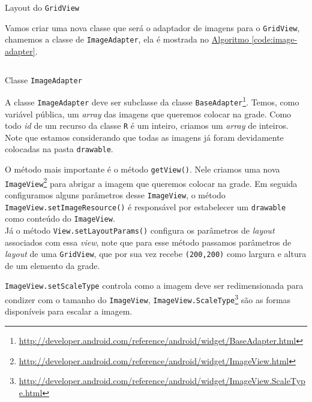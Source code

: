 \documentclass[a4paper,12pt,brazil,oneside]{book}
\begin{document}
\begin{listing}[H]
\inputminted[linenos=true,fontsize=\small,frame=lines, framesep=2mm, tabsize=2,numbersep=5pt]{xml}{src/design/gridview.xml}
\caption{Layout do \texttt{GridView}}
\end{listing}	

Vamos criar uma nova classe que será o adaptador de imagens para o \texttt{GridView}, chamemos a classe de \texttt{ImageAdapter}, ela é mostrada no \hyperref[code:image-adapter]{Algoritmo \ref*{code:image-adapter}}.

\begin{listing}[H]
\inputminted[linenos=true,fontsize=\small,frame=lines, framesep=2mm, tabsize=2,numbersep=5pt]{java}{src/design/imageadapter.java}
\caption{Classe \texttt{ImageAdapter}}
\label{code:image-adapter}
\end{listing}	

A classe \texttt{ImageAdapter} deve ser subclasse da classe \texttt{BaseAdapter}\footnote{\href{http://developer.android.com/reference/android/widget/BaseAdaptfer.html}{http://developer.android.com/reference/android/widget/BaseAdapter.html}}. Temos, como variável pública, um \emph{array} das imagens que queremos colocar na grade. Como todo \emph{id} de um recurso da classe \texttt{R} é um inteiro, criamos um \emph{array} de inteiros. Note que estamos considerando que todas as imagens já foram devidamente colocadas na pasta \texttt{drawable}.

O método mais importante é o método \texttt{getView()}. Nele criamos uma nova \texttt{ImageView}\footnote{\href{http://developer.android.com/reference/android/widget/ImageView.html}{http://developer.android.com/reference/android/widget/ImageView.html}} para abrigar a imagem que queremos colocar na grade. Em seguida configuramos alguns parâmetros desse \texttt{ImageView}, o método \texttt{ImageView.setImageResource()} é responsável por estabelecer um \texttt{drawable} como conteúdo do \texttt{ImageView}. \\ Já o método \texttt{View.setLayoutParams()} configura os parâmetros de \emph{layout} associados com essa \emph{view}, note que para esse método passamos parâmetros de \emph{layout} de uma \texttt{GridView}, que por sua vez recebe \texttt{(200,200)} como largura e altura de um elemento da grade.

  \texttt{ImageView.setScaleType} controla como a imagem deve ser redimensionada para condizer com o tamanho do \texttt{ImageView}, \texttt{ImageView.ScaleType}\footnote{\href{http://developer.android.com/reference/android/widget/ImageView.ScaleType.html}{http://developer.android.com/reference/android/widget/ImageView.ScaleType.html}} são as formas disponíveis para escalar a imagem.
\end{document}
